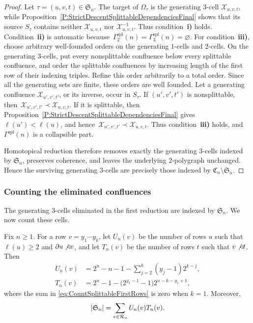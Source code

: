 \documentclass[a4paper, twoside, 11pt, english]{article}
\begin{document}
\begin{proof}
Let $\tau=(u,v,t)\in\mathfrak S_n$. The target of $\Omega_\tau$ is the
generating $3$-cell $\mathcal X_{u,v,t}$, while
Proposition~\ref{P:StrictDescentSplittableDependenciesFinal} shows that
its source $S_\tau$ contains neither $\mathcal X_{u,v,t}$ nor
$\mathcal X_{u,v,t}^{-1}$. Thus condition~\textup{\textbf{i)}} holds.
Condition~\textup{\textbf{ii)}} is automatic because~$
\Gamma_2^{\mathrm{spl}}(n)
=
\Gamma_3^{\mathrm{spl}}(n)
=
\varnothing$.
For condition~\textup{\textbf{iii)}}, choose arbitrary well-founded
orders on the generating $1$-cells and $2$-cells. On the generating
$3$-cells, put every nonsplittable confluence below every splittable
confluence, and order the splittable confluences by increasing length
of the first row of their indexing triples. Refine this order
arbitrarily to a total order. Since all the generating sets are finite,
these orders are well founded.
Let a generating confluence $\mathcal X_{u',v',t'}$, or its inverse,
occur in $S_\tau$.  If
$(u',v',t')$ is nonsplittable, then~$\mathcal X_{u',v',t'}
\prec
\mathcal X_{u,v,t}$.
If it is splittable, then
Proposition~\ref{P:StrictDescentSplittableDependenciesFinal} gives
$\ell(u')<\ell(u)$, and hence~$\mathcal X_{u',v',t'}\prec \mathcal X_{u,v,t}$.
Thus condition~\textup{\textbf{iii)}} holds, and~$\Gamma^{\mathrm{spl}}(n)$ is a collapsible part.

Homotopical reduction therefore removes exactly the generating
$3$-cells indexed by $\mathfrak S_n$, preserves coherence, and leaves
the underlying $2$-polygraph unchanged. Hence the surviving generating
$3$-cells are precisely those indexed by
$\mathfrak C_n\setminus\mathfrak S_n$.
\end{proof}

\subsubsection{Counting the eliminated confluences}

The generating $3$-cells eliminated in the first reduction are indexed by
$\mathfrak S_n$. We now count these cells.

\begin{proposition}
\label{P:CountSplittableTriplesFinal}
Fix $n\geq1$. For a row $v=y_1\cdots y_k$, let $U_n(v)$ be the
number of rows $u$ such that~$\ell(u)\geq2$ and $\partial u\not\triangleleft v$, and let $T_n(v)$
be the number of rows $t$ such that $v\not\triangleleft t$. Then
\begin{align}
U_n(v)
&=
2^n-n-1
-
\sum_{j=2}^k(y_j-1)2^{k-j},
\label{eq:CountSplittableFirstRows}
\\
T_n(v)
&=
2^n-1
-
\bigl(2^{y_1-1}-1\bigr)2^{n-k-y_1+1},
\label{eq:CountSplittableThirdRows}
\end{align}
where the sum in \eqref{eq:CountSplittableFirstRows} is zero when
$k=1$. Moreover,
\begin{equation}
\label{eq:CountSplittableFinal}
|\mathfrak S_n|
=
\sum_{v\in\mathcal{R}_n}
U_n(v)T_n(v).
\end{equation}
\end{proposition}
\end{document}

